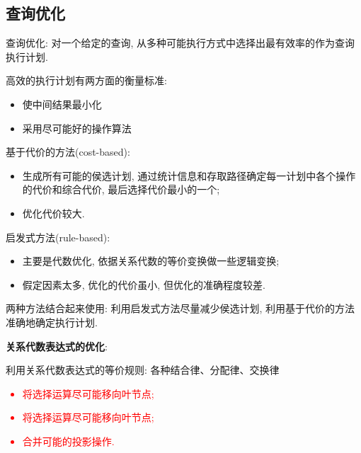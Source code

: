 \subsection{查询优化}

\begin{definition}[查询优化]
    查询优化: 对一个给定的查询, 从多种可能执行方式中选择出最有效率的作为查询执行计划.
\end{definition}

高效的执行计划有两方面的衡量标准:
\begin{itemize}
    \item 使中间结果最小化
    \item 采用尽可能好的操作算法
\end{itemize}

\begin{definition}
    基于代价的方法(cost-based): 
    \begin{itemize}
        \item 生成所有可能的侯选计划, 通过统计信息和存取路径确定每一计划中各个操作的代价和综合代价, 最后选择代价最小的一个;
        \item 优化代价较大.
    \end{itemize}
\end{definition}

\begin{definition}
    启发式方法(rule-based):
    \begin{itemize}
        \item 主要是代数优化, 依据关系代数的等价变换做一些逻辑变换;
        \item 假定因素太多, 优化的代价虽小, 但优化的准确程度较差.
    \end{itemize}
\end{definition}

两种方法结合起来使用: 利用启发式方法尽量减少侯选计划, 利用基于代价的方法准确地确定执行计划.

\textbf{关系代数表达式的优化}:

利用关系代数表达式的等价规则: 各种结合律、分配律、交换律
\textcolor{red}{
    \begin{itemize}
    \item 将选择运算尽可能移向叶节点;
    \item 将选择运算尽可能移向叶节点;
    \item 合并可能的投影操作.
\end{itemize}
}

